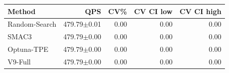 \begin{tabular}{lrrrr}
\hline
Method & QPS & CV\% & CV CI low & CV CI high \\
\hline
Random-Search & 479.79$\pm$0.01 & 0.00 & 0.00 & 0.00 \\
SMAC3 & 479.79$\pm$0.00 & 0.00 & 0.00 & 0.00 \\
Optuna-TPE & 479.79$\pm$0.00 & 0.00 & 0.00 & 0.00 \\
V9-Full & 479.79$\pm$0.00 & 0.00 & 0.00 & 0.00 \\
\hline
\end{tabular}